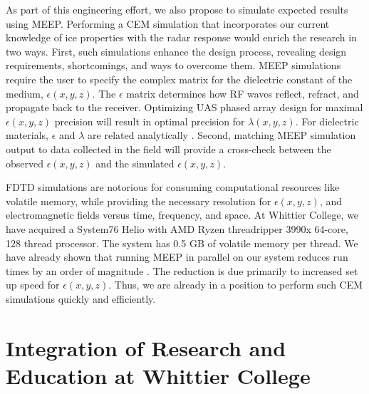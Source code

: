 \documentclass[../../main.tex]{subfiles}
\begin{document}
As part of this engineering effort, we also propose to simulate expected results using MEEP.  Performing a CEM simulation that incorporates our current knowledge of ice properties with the radar response would enrich the research in two ways.  First, such simulations enhance the design process, revealing design requirements, shortcomings, and ways to overcome them.  MEEP simulations require the user to specify the complex matrix for the dielectric constant of the medium, $\epsilon(x,y,z)$.  The $\epsilon$ matrix  determines how RF waves reflect, refract, and propagate back to the receiver.  Optimizing UAS phased array design for maximal $\epsilon(x,y,z)$ precision will result in optimal precision for $\lambda(x,y,z)$.  For dielectric materials, $\epsilon$ and $\lambda$ are related analytically \cite{10.3189/2015jog14j214}.  Second, matching MEEP simulation output to data collected in the field will provide a cross-check between the observed $\epsilon(x,y,z)$ and the simulated $\epsilon(x,y,z)$. \\ \vspace{2.5mm}

FDTD simulations are notorious for consuming computational resources like volatile memory, while providing the necessary resolution for $\epsilon(x,y,z)$, and electromagnetic fields versus time, frequency, and space.  At Whittier College, we have acquired a System76 Helio with AMD Ryzen threadripper 3990x 64-core, 128 thread processor.  The system has 0.5 GB of volatile memory per thread.  We have already shown that running MEEP in parallel on our system reduces run times by an order of magnitude \cite{meepcon2022}.  The reduction is due primarily to increased set up speed for $\epsilon(x,y,z)$.  Thus, we are already in a position to perform such CEM simulations quickly and efficiently.

\section{Integration of Research and Education at Whittier College}
\label{sec:int}
\end{document}
